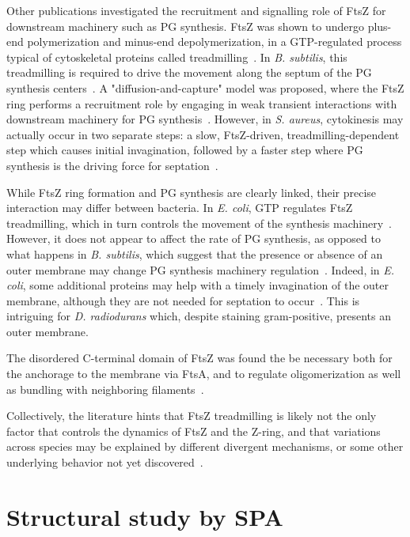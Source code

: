 Other publications investigated the recruitment and signalling role of FtsZ for downstream machinery such as PG synthesis.
FtsZ was shown to undergo plus-end polymerization and minus-end depolymerization, in a GTP-regulated process typical of cytoskeletal proteins called treadmilling~\cite{looseBacterialCellDivision2014}.
In \textit{B. subtilis}, this treadmilling is required to drive the movement along the septum of the PG synthesis centers~\cite{bisson-filhoTreadmillingFtsZFilaments2017}.
A "diffusion-and-capture" model was proposed, where the FtsZ ring performs a recruitment role by engaging in weak transient interactions with downstream machinery for PG synthesis~\cite{baranovaDiffusionCapturePermits2020}.
However, in \textit{S. aureus}, cytokinesis may actually occur in two separate steps: a slow, FtsZ-driven, treadmilling-dependent step which causes initial invagination, followed by a faster step where PG synthesis is the driving force for septation~\cite{monteiroPeptidoglycanSynthesisDrives2018}.

While FtsZ ring formation and PG synthesis are clearly linked, their precise interaction may differ between bacteria.
In \textit{E. coli}, GTP regulates FtsZ treadmilling, which in turn controls the movement of the synthesis machinery~\cite{yangGTPaseActivityCoupled2017}.
However, it does not appear to affect the rate of PG synthesis, as opposed to what happens in \textit{B. subtilis}, which suggest that the presence or absence of an outer membrane may change PG synthesis machinery regulation~\cite{yangGTPaseActivityCoupled2017}.
Indeed, in \textit{E. coli}, some additional proteins may help with a timely invagination of the outer membrane, although they are not needed for septation to occur~\cite{gerdingTransenvelopeTolPal2007}.
This is intriguing for \textit{D. radiodurans} which, despite staining gram-positive, presents an outer membrane.

The disordered C-terminal domain of FtsZ was found the be necessary both for the anchorage to the membrane via FtsA, and to regulate oligomerization as well as bundling with neighboring filaments~\cite{barrowsFtsZDynamicsBacterial2021}.

Collectively, the literature hints that FtsZ treadmilling is likely not the only factor that controls the dynamics of FtsZ and the Z-ring, and that variations across species may be explained by different divergent mechanisms, or some other underlying behavior not yet discovered~\cite{barrowsFtsZDynamicsBacterial2021}.

\section{Structural study by SPA}

